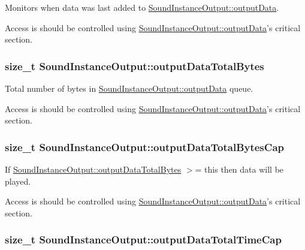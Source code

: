Monitors when data was last added to \hyperlink{class_sound_instance_output_ad8422553602e12785eab486a27796da3}{SoundInstanceOutput::outputData}. 

Access is should be controlled using \hyperlink{class_sound_instance_output_ad8422553602e12785eab486a27796da3}{SoundInstanceOutput::outputData}'s critical section. \hypertarget{class_sound_instance_output_ac3f6a1350dd4cb7960ec0dafbb0d7b45}{
\subsubsection[{outputDataTotalBytes}]{\setlength{\rightskip}{0pt plus 5cm}size\_\-t {\bf SoundInstanceOutput::outputDataTotalBytes}}}
\label{class_sound_instance_output_ac3f6a1350dd4cb7960ec0dafbb0d7b45}


Total number of bytes in \hyperlink{class_sound_instance_output_ad8422553602e12785eab486a27796da3}{SoundInstanceOutput::outputData} queue. 

Access is should be controlled using \hyperlink{class_sound_instance_output_ad8422553602e12785eab486a27796da3}{SoundInstanceOutput::outputData}'s critical section. \hypertarget{class_sound_instance_output_acaa4c6f3eca8eddea6cfd289d07a0124}{
\subsubsection[{outputDataTotalBytesCap}]{\setlength{\rightskip}{0pt plus 5cm}size\_\-t {\bf SoundInstanceOutput::outputDataTotalBytesCap}}}
\label{class_sound_instance_output_acaa4c6f3eca8eddea6cfd289d07a0124}


If \hyperlink{class_sound_instance_output_ac3f6a1350dd4cb7960ec0dafbb0d7b45}{SoundInstanceOutput::outputDataTotalBytes} $>$= this then data will be played. 

Access is should be controlled using \hyperlink{class_sound_instance_output_ad8422553602e12785eab486a27796da3}{SoundInstanceOutput::outputData}'s critical section. \hypertarget{class_sound_instance_output_a3b7132b8d865398f9b37ed6a715b3855}{
\subsubsection[{outputDataTotalTimeCap}]{\setlength{\rightskip}{0pt plus 5cm}size\_\-t {\bf SoundInstanceOutput::outputDataTotalTimeCap}}}
\label{class_sound_instance_output_a3b7132b8d865398f9b37ed6a715b3855}


